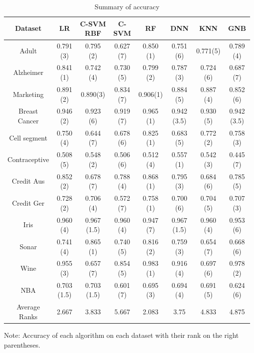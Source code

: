 \documentclass[a4paper,12pt]{article}
\numberwithin{equation}{section}
\begin{document}
\begin{table}[h]
\begin{center}
\caption{Summary of accuracy}
\begin{threeparttable}
\begin{tabular}{ |c|c|c|c|c|c|c|c| } 
 \hline
 Dataset & LR & C-SVM RBF & C-SVM & RF & DNN & KNN & GNB \\ 
 \hline 
 Adult & 0.791 (3) & 0.795 (2) & 0.627 (7)& 0.850 (1) & 0.751 (6) & 0.771(5) & 0.789 (4)\\[1pt]
 Alzheimer & 0.841 (1) & 0.742 (4) & 0.730 (5) & 0.799 (2) & 0.787 (3)& 0.724 (6)& 0.687 (7) \\[1pt]
 Marketing & 0.891 (2) & 0.890(3) & 0.834 (7) & 0.906(1) & 0.884 (5) & 0.887 (4)& 0.852 (6)\\[1pt]
 Breast Cancer & 0.946 (2)& 0.923 (6) & 0.919 (7) & 0.965 (1) & 0.942 (3.5) & 0.930 (5) & 0.942 (3.5)\\[1pt]
 Cell segment & 0.750 (4) & 0.644 (7) & 0.678 (6) & 0.825 (1) & 0.683 (5)& 0.772 (2)& 0.758 (3) \\[1pt]
 Contraceptive & 0.508 (5) & 0.548 (2) & 0.506 (6) & 0.512 (4) & 0.557 (1) & 0.542 (3) & 0.445 (7) \\[1pt]
 Credit Aus & 0.852 (2) & 0.678 (7) & 0.788 (4) & 0.868 (1) & 0.795 (3) & 0.684 (6) & 0.785 (5) \\[1pt]
 Credit Ger & 0.728 (2) & 0.706 (4) & 0.572 (7) & 0.758 (1) & 0.700 (6) & 0.704 (5) & 0.707 (3)\\[1pt]
 Iris & 0.960 (4) & 0.967 (1.5) & 0.960 (4) & 0.947 (7) & 0.967 (1.5) & 0.960 (4) & 0.953 (6) \\[1pt]
 Sonar & 0.741 (4) & 0.865 (1) & 0.740 (5) & 0.816 (2) & 0.759 (3) & 0.654 (7) & 0.668 (6) \\[1pt]
 Wine & 0.955 (3) & 0.657 (7) & 0.854 (5) & 0.983 (1) & 0.916 (4) & 0.697 (6) & 0.978 (2) \\[1pt]
 NBA  & 0.703 (1.5) & 0.703 (1.5) & 0.601 (7) & 0.695 (3) & 0.694 (4) & 0.691 (5) & 0.624 (6) \\[1pt]
 \hline
 Average Ranks & 2.667  & 3.833 & 5.667 & 2.083 & 3.75 & 4.833 & 4.875 \\
 \hline

\end{tabular}
\begin{tablenotes}
\small
\item   Note: Accuracy of each algorithm on each dataset with their rank on the right parentheses.
\end{tablenotes}
\end{threeparttable}
\label{table:5}
\end{center}
\end{table}
\end{document}
